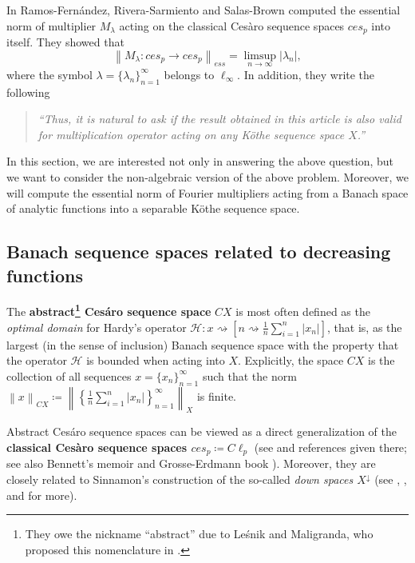 \documentclass[11pt]{amsart}
\theoremstyle{definition}
\theoremstyle{definition}
\theoremstyle{definition}
\theoremstyle{definition}
\theoremstyle{definition}
\theoremstyle{definition}
\theoremstyle{definition}
\theoremstyle{definition}
\numberwithin{equation}{section}
\numberwithin{equation}{section}
\numberwithin{equation}{section}
\theoremstyle{definition}
\theoremstyle{definition}
\theoremstyle{definition}
\theoremstyle{definition}
\theoremstyle{definition}
\theoremstyle{definition}
\newcommand{\norm}[1]{\left\lVert#1\right\rVert}
\newcommand{\abs}[1]{\left\lvert#1\right\rvert}
\begin{document}
In \cite{RFRSSB19} Ramos-Fern{\' a}ndez, Rivera-Sarmiento and Salas-Brown computed the essential norm of multiplier $M_{\lambda}$
acting on the classical Ces{\` a}ro sequence spaces $ces_p$ into itself. They showed that
\begin{equation*}
	\norm{M_{\lambda} \colon ces_p \rightarrow ces_p}_{ess} = \limsup\limits_{n \rightarrow \infty} \abs{\lambda_n},
\end{equation*}
where the symbol $\lambda = \{\lambda_n\}_{n=1}^{\infty}$ belongs to $\ell_{\infty}$. In addition, they write the following
\begin{quote}
	{\it \enquote{Thus, it is natural to ask if the result obtained in this article is also valid for multiplication operator acting on any K{\" o}the sequence space $X$.}}
\end{quote}
In this section, we are interested not only in answering the above question, but we want to consider the non-algebraic version
of the above problem. Moreover, we will compute the essential norm of Fourier multipliers acting from a Banach space of analytic
functions into a separable K{\" o}the sequence space.

\subsection{Banach sequence spaces related to decreasing functions}

The {\bf abstract\footnote{They owe the nickname \enquote{abstract} due to Le{\' s}nik and Maligranda, who proposed this nomenclature in \cite{LM15a}.}
Ces{\' a}ro sequence space} $CX$ is most often defined as the {\it optimal domain} for Hardy's operator
$\mathscr{H} \colon x \rightsquigarrow \left[ n \rightsquigarrow \frac{1}{n} \sum_{i=1}^n \abs{x_n} \right]$,
that is, as the largest (in the sense of inclusion) Banach sequence space with the property that the operator $\mathscr{H}$
is bounded when acting into $X$. Explicitly, the space $CX$ is the collection of all sequences $x = \{x_n\}_{n=1}^{\infty}$
such that the norm
$\norm{x}_{CX} \coloneqq \norm{ \left\{ \frac{1}{n} \sum_{i=1}^n \abs{x_n} \right\}_{n=1}^{\infty} }_X$
is finite.

Abstract Ces{\' a}ro sequence spaces can be viewed as a direct generalization of the {\bf classical Ces{\` a}ro sequence spaces $ces_p \coloneqq C\ell_p$}
(see \cite{AM14} and references given there; see also Bennett's memoir \cite{Ben96} and Grosse-Erdmann book \cite{GE98}).
Moreover, they are closely related to Sinnamon's construction of the so-called {\it down spaces $X^{\downarrow}$} (see \cite{KMS07}, \cite{LM15a}, \cite{MS06} and \cite{Si94} for more).
\end{document}
